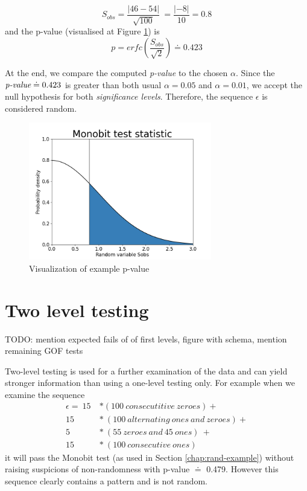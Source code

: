 \documentclass[
  digital,     %
  oneside,     %
  nosansbold,  %
  nocolorbold, %
  nolof,         %
  nolot,         %
]{fithesis4}
\begin{document}
 \[S_{obs} = \dfrac{|46 - 54|}{\sqrt{100}}\ = \dfrac{|-8|}{10} = 0.8\]
 and the p-value (visualised at Figure \ref{fig:example}) is 
 \[p = erfc(\dfrac{S_{obs}}{\sqrt{2}}) \doteq 0.423\]

At the end, we compare the computed \emph{p-value} to the chosen $\alpha$. Since the $\emph{p-value} \doteq 0.423$ is greater than both usual $\alpha = 0.05$ and $\alpha = 0.01$, we accept the null hypothesis for both \emph{significance levels}. Therefore, the sequence $\epsilon$ is considered random.

\begin{figure}
  \begin{center}
    \includegraphics[width=8cm]{figures/test_example.png}
  \end{center}
  \caption{Visualization of example p-value}
  \label{fig:example}
\end{figure}

 



\section{Two level testing} \label{chap:rand-two_level}

TODO: mention expected fails of of first levels, figure with schema, mention remaining GOF tests


Two-level testing is used for a further examination of the data and can yield stronger information than using a one-level testing only. For example when we examine the sequence 
\[\begin{split}
    \epsilon =\:15\: &* (100\:consecutitive\:zeroes) + \\
    15\:&*\:(100\:alternating\:ones\:and\:zeroes) + \\
    5\:&*\:(55\:zeroes\:and\:45\:ones)\:+\:\\
    15\:&*\:(100\:consecutive\:ones)
\end{split}\]
it will pass the Monobit test (as used in Section \ref{chap:rand-example}) without raising suspicions of non-randomness with p-value $\doteq$ 0.479. However this sequence clearly contains a pattern and is not random. 
\end{document}
